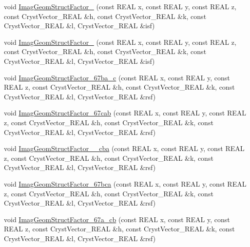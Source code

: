 \begin{DoxyCompactItemize}
\item 
void \mbox{\hyperlink{namespace_obj_cryst_a4e32a246a42fea8ebfcc20236c8565a5}{Imag\+Geom\+Struct\+Factor\+\_}} (const R\+E\+AL x, const R\+E\+AL y, const R\+E\+AL z, const Cryst\+Vector\+\_\+\+R\+E\+AL \&h, const Cryst\+Vector\+\_\+\+R\+E\+AL \&k, const Cryst\+Vector\+\_\+\+R\+E\+AL \&l, Cryst\+Vector\+\_\+\+R\+E\+AL \&isf)
\item 
void \mbox{\hyperlink{namespace_obj_cryst_a69521b92e103823ab8b1ec2170e635f6}{Imag\+Geom\+Struct\+Factor\+\_}} (const R\+E\+AL x, const R\+E\+AL y, const R\+E\+AL z, const Cryst\+Vector\+\_\+\+R\+E\+AL \&h, const Cryst\+Vector\+\_\+\+R\+E\+AL \&k, const Cryst\+Vector\+\_\+\+R\+E\+AL \&l, Cryst\+Vector\+\_\+\+R\+E\+AL \&isf)
\item 
void \mbox{\hyperlink{namespace_obj_cryst_af4ed93881a6e70073c45ed8b27e7dd30}{Imag\+Geom\+Struct\+Factor\+\_\+67ba\+\_\+c}} (const R\+E\+AL x, const R\+E\+AL y, const R\+E\+AL z, const Cryst\+Vector\+\_\+\+R\+E\+AL \&h, const Cryst\+Vector\+\_\+\+R\+E\+AL \&k, const Cryst\+Vector\+\_\+\+R\+E\+AL \&l, Cryst\+Vector\+\_\+\+R\+E\+AL \&rsf)
\item 
void \mbox{\hyperlink{namespace_obj_cryst_acdc196b114308b48ca273817f04da705}{Imag\+Geom\+Struct\+Factor\+\_\+67cab}} (const R\+E\+AL x, const R\+E\+AL y, const R\+E\+AL z, const Cryst\+Vector\+\_\+\+R\+E\+AL \&h, const Cryst\+Vector\+\_\+\+R\+E\+AL \&k, const Cryst\+Vector\+\_\+\+R\+E\+AL \&l, Cryst\+Vector\+\_\+\+R\+E\+AL \&rsf)
\item 
void \mbox{\hyperlink{namespace_obj_cryst_a3efc70018737c3fa09174b5888240953}{Imag\+Geom\+Struct\+Factor\+\_\+\_\+cba}} (const R\+E\+AL x, const R\+E\+AL y, const R\+E\+AL z, const Cryst\+Vector\+\_\+\+R\+E\+AL \&h, const Cryst\+Vector\+\_\+\+R\+E\+AL \&k, const Cryst\+Vector\+\_\+\+R\+E\+AL \&l, Cryst\+Vector\+\_\+\+R\+E\+AL \&rsf)
\item 
void \mbox{\hyperlink{namespace_obj_cryst_ad4298011033a997b83029986f46d30e2}{Imag\+Geom\+Struct\+Factor\+\_\+67bca}} (const R\+E\+AL x, const R\+E\+AL y, const R\+E\+AL z, const Cryst\+Vector\+\_\+\+R\+E\+AL \&h, const Cryst\+Vector\+\_\+\+R\+E\+AL \&k, const Cryst\+Vector\+\_\+\+R\+E\+AL \&l, Cryst\+Vector\+\_\+\+R\+E\+AL \&rsf)
\item 
void \mbox{\hyperlink{namespace_obj_cryst_a4b2352507c09881913ff909efae05c6f}{Imag\+Geom\+Struct\+Factor\+\_\+67a\+\_\+cb}} (const R\+E\+AL x, const R\+E\+AL y, const R\+E\+AL z, const Cryst\+Vector\+\_\+\+R\+E\+AL \&h, const Cryst\+Vector\+\_\+\+R\+E\+AL \&k, const Cryst\+Vector\+\_\+\+R\+E\+AL \&l, Cryst\+Vector\+\_\+\+R\+E\+AL \&rsf)

\end{DoxyCompactItemize}
